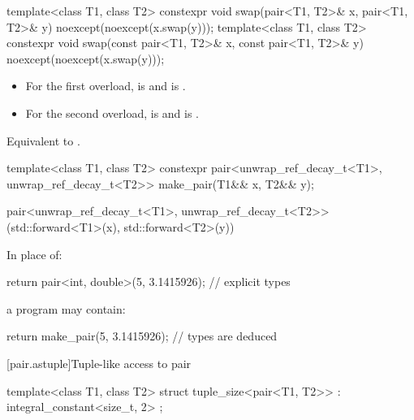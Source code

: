 %
\begin{itemdecl}
template<class T1, class T2>
  constexpr void swap(pair<T1, T2>& x, pair<T1, T2>& y) noexcept(noexcept(x.swap(y)));
template<class T1, class T2>
  constexpr void swap(const pair<T1, T2>& x, const pair<T1, T2>& y) noexcept(noexcept(x.swap(y)));
\end{itemdecl}

\begin{itemdescr}
\pnum
\constraints
\begin{itemize}
\item
For the first overload,
 is  and
 is .
\item
For the second overload,
 is  and
 is .
\end{itemize}

\pnum
\effects
Equivalent to .
\end{itemdescr}

%
\begin{itemdecl}
template<class T1, class T2>
  constexpr pair<unwrap_ref_decay_t<T1>, unwrap_ref_decay_t<T2>> make_pair(T1&& x, T2&& y);
\end{itemdecl}

\begin{itemdescr}
\pnum
\returns
\begin{codeblock}
pair<unwrap_ref_decay_t<T1>,
     unwrap_ref_decay_t<T2>>(std::forward<T1>(x), std::forward<T2>(y))
\end{codeblock}
\end{itemdescr}

\pnum
\begin{example}
In place of:
\begin{codeblock}
return pair<int, double>(5, 3.1415926);     // explicit types
\end{codeblock}
a \Cpp{} program may contain:
\begin{codeblock}
return make_pair(5, 3.1415926);             // types are deduced
\end{codeblock}
\end{example}

[pair.astuple]{Tuple-like access to pair}

%
\begin{itemdecl}
template<class T1, class T2>
  struct tuple_size<pair<T1, T2>> : integral_constant<size_t, 2> { };
\end{itemdecl}

